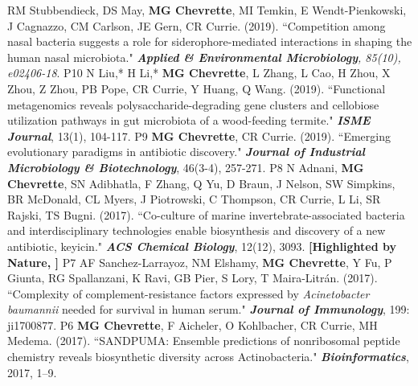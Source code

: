 \begin{cvpubs}
  \cvpub
    {RM Stubbendieck, DS May, \textbf{MG Chevrette}, MI Temkin, E Wendt-Pienkowski, J Cagnazzo, CM Carlson, JE Gern, CR Currie. (2019). ``Competition among nasal bacteria suggests a role for siderophore-mediated interactions in shaping the human nasal microbiota." \textit{\textbf{Applied \& Environmental Microbiology}, 85(10), e02406-18}. \textbf{\textit{}}
    } %
    {P10} %
  \cvpub
    {N Liu,* H Li,* \textbf{MG Chevrette}, L Zhang, L Cao, H Zhou, X Zhou, Z Zhou, PB Pope, CR Currie, Y Huang, Q Wang. (2019). ``Functional metagenomics reveals polysaccharide-degrading gene clusters and cellobiose utilization pathways in gut microbiota of a wood-feeding termite." \textit{\textbf{ISME Journal}}, 13(1), 104-117. \textbf{\textit{}}     
    } %
    {P9} %
  \cvpub
    {\textbf{MG Chevrette}, CR Currie. (2019). ``Emerging evolutionary paradigms in antibiotic discovery." \textit{\textbf{Journal of Industrial Microbiology \& Biotechnology}}, 46(3-4), 257-271. \textbf{\textit{}}
    } %
    {P8} %
  \cvpub
    {N Adnani, \textbf{MG Chevrette}, SN Adibhatla, F Zhang, Q Yu, D Braun, J Nelson, SW Simpkins, BR McDonald, CL Myers, J Piotrowski, C Thompson, CR Currie, L Li, SR Rajski, TS Bugni. (2017). ``Co-culture of marine invertebrate-associated bacteria and interdisciplinary technologies enable biosynthesis and discovery of a new antibiotic, keyicin." \textit{\textbf{ACS Chemical Biology}}, 12(12), 3093.  \textbf{\textit{}} 
    \linebreak \textbf{[Highlighted by Nature, \textit{}]}
    } %
    {P7} %
  \cvpub
    {AF Sanchez-Larrayoz, NM Elshamy, \textbf{MG Chevrette}, Y Fu, P Giunta, RG Spallanzani, K Ravi, GB Pier, S Lory, T Maira-Litr\'{a}n. (2017). ``Complexity of complement-resistance factors expressed by \textit{Acinetobacter baumannii} needed for survival in human serum." \textit{\textbf{Journal of Immunology}}, 199: ji1700877. \textbf{\textit{}} }%
    {P6} %
  \cvpub
    {\textbf{MG Chevrette}, F Aicheler, O Kohlbacher, CR Currie, MH Medema. (2017). ``SANDPUMA: Ensemble predictions of nonribosomal peptide chemistry reveals biosynthetic diversity across Actinobacteria." \textit{\textbf{Bioinformatics}}, 2017, 1–9. \textbf{\textit{}} } %

\end{cvpubs}
